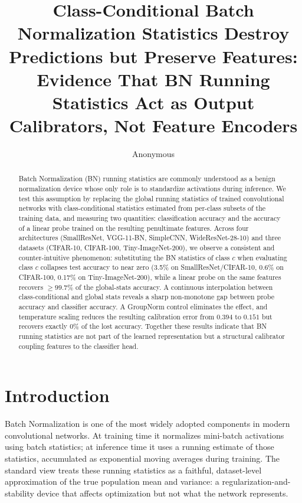 \documentclass[11pt]{article}
\title{Class-Conditional Batch Normalization Statistics Destroy Predictions but Preserve Features:\\
Evidence That BN Running Statistics Act as Output Calibrators, Not Feature Encoders}
\author{Anonymous}
\date{}
\begin{document}
\maketitle

\begin{abstract}
Batch Normalization (BN) running statistics are commonly understood as a benign normalization device whose only role is to standardize activations during inference. We test this assumption by replacing the global running statistics of trained convolutional networks with class-conditional statistics estimated from per-class subsets of the training data, and measuring two quantities: classification accuracy and the accuracy of a linear probe trained on the resulting penultimate features. Across four architectures (SmallResNet, VGG-11-BN, SimpleCNN, WideResNet-28-10) and three datasets (CIFAR-10, CIFAR-100, Tiny-ImageNet-200), we observe a consistent and counter-intuitive phenomenon: substituting the BN statistics of class $c$ when evaluating class $c$ collapses test accuracy to near zero (3.5\% on SmallResNet/CIFAR-10, 0.6\% on CIFAR-100, 0.17\% on Tiny-ImageNet-200), while a linear probe on the same features recovers $\geq 99.7\%$ of the global-stats accuracy. A continuous interpolation between class-conditional and global stats reveals a sharp non-monotone gap between probe accuracy and classifier accuracy. A GroupNorm control eliminates the effect, and temperature scaling reduces the resulting calibration error from $0.394$ to $0.151$ but recovers exactly $0\%$ of the lost accuracy. Together these results indicate that BN running statistics are not part of the learned representation but a structural calibrator coupling features to the classifier head.
\end{abstract}

\section{Introduction}

Batch Normalization \cite{ioffe2015} is one of the most widely adopted components in modern convolutional networks. At training time it normalizes mini-batch activations using batch statistics; at inference time it uses a running estimate of those statistics, accumulated as exponential moving averages during training. The standard view treats these running statistics as a faithful, dataset-level approximation of the true population mean and variance: a regularization-and-stability device that affects optimization but not what the network represents.
\end{document}
